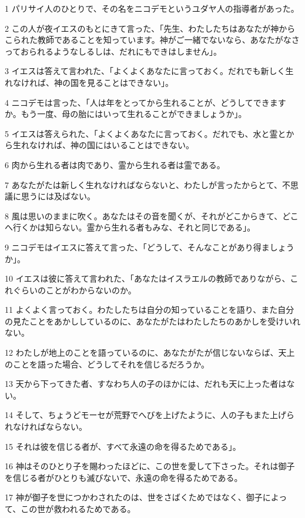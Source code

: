 \par 1 パリサイ人のひとりで、その名をニコデモというユダヤ人の指導者があった。
\par 2 この人が夜イエスのもとにきて言った、「先生、わたしたちはあなたが神からこられた教師であることを知っています。神がご一緒でないなら、あなたがなさっておられるようなしるしは、だれにもできはしません」。
\par 3 イエスは答えて言われた、「よくよくあなたに言っておく。だれでも新しく生れなければ、神の国を見ることはできない」。
\par 4 ニコデモは言った、「人は年をとってから生れることが、どうしてできますか。もう一度、母の胎にはいって生れることができましょうか」。
\par 5 イエスは答えられた、「よくよくあなたに言っておく。だれでも、水と霊とから生れなければ、神の国にはいることはできない。
\par 6 肉から生れる者は肉であり、霊から生れる者は霊である。
\par 7 あなたがたは新しく生れなければならないと、わたしが言ったからとて、不思議に思うには及ばない。
\par 8 風は思いのままに吹く。あなたはその音を聞くが、それがどこからきて、どこへ行くかは知らない。霊から生れる者もみな、それと同じである」。
\par 9 ニコデモはイエスに答えて言った、「どうして、そんなことがあり得ましょうか」。
\par 10 イエスは彼に答えて言われた、「あなたはイスラエルの教師でありながら、これぐらいのことがわからないのか。
\par 11 よくよく言っておく。わたしたちは自分の知っていることを語り、また自分の見たことをあかししているのに、あなたがたはわたしたちのあかしを受けいれない。
\par 12 わたしが地上のことを語っているのに、あなたがたが信じないならば、天上のことを語った場合、どうしてそれを信じるだろうか。
\par 13 天から下ってきた者、すなわち人の子のほかには、だれも天に上った者はない。
\par 14 そして、ちょうどモーセが荒野でへびを上げたように、人の子もまた上げられなければならない。
\par 15 それは彼を信じる者が、すべて永遠の命を得るためである」。
\par 16 神はそのひとり子を賜わったほどに、この世を愛して下さった。それは御子を信じる者がひとりも滅びないで、永遠の命を得るためである。
\par 17 神が御子を世につかわされたのは、世をさばくためではなく、御子によって、この世が救われるためである。
